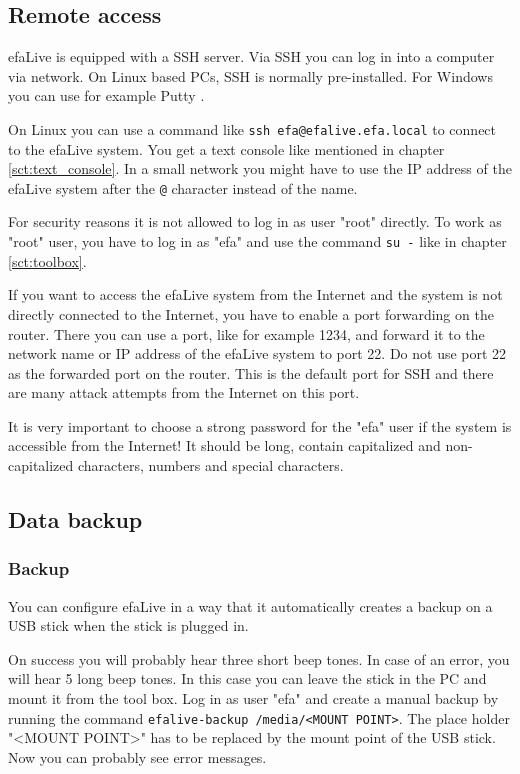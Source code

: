 \documentclass[a4paper,12pt,twoside]{article}
\begin{document}
\subsection{Remote access}
\label{sct:remote_access}
efaLive is equipped with a SSH server. Via SSH you can log in into a
computer via network. On Linux based PCs, SSH is normally
pre-installed. For Windows you can use for example Putty \cite{PUT1}.

On Linux you can use a command like \texttt{ssh
efa@efalive.efa.local} to connect to the efaLive system.
You get a text console like mentioned in chapter \ref{sct:text_console}. In a small
network you might have to use the IP address of the efaLive system
after the \texttt{@} character instead of the
name.

For security reasons it is not allowed to log in as user
"root" directly. To work as
"root" user, you have to log in as
"efa" and use the command \texttt{su -} like in chapter \ref{sct:toolbox}.

If you want to access the efaLive system from the Internet and the
system is not directly connected to the Internet, you have to enable a
port forwarding on the router. There you can use a port, like for
example 1234, and forward it to the network name or IP address of the
efaLive system to port 22. Do not use port 22 as the forwarded port on
the router. This is the default port for SSH and there are many attack
attempts from the Internet on this port.

It is very important to choose a strong password for the
"efa" user if the system is accessible from
the Internet! It should be long, contain capitalized and
non-capitalized characters, numbers and special characters.


\subsection{Data backup}
\label{sct:data_backup}
\subsubsection{Backup}
\label{bkm:backup}
You can configure efaLive in a way
that it automatically creates a backup on a USB stick when the stick is
plugged in.

On success you will probably hear three short beep tones. In case of an
error, you will hear 5 long beep tones. In this case you can leave the
stick in the PC and mount it from the tool box. Log in as user
"efa" and create a manual backup by running
the command \texttt{efalive-backup /media/{\textless}MOUNT
POINT{\textgreater}}. The place holder
"{\textless}MOUNT POINT{\textgreater}" has
to be replaced by the mount point of the USB stick. Now you can
probably see error messages.
\end{document}
